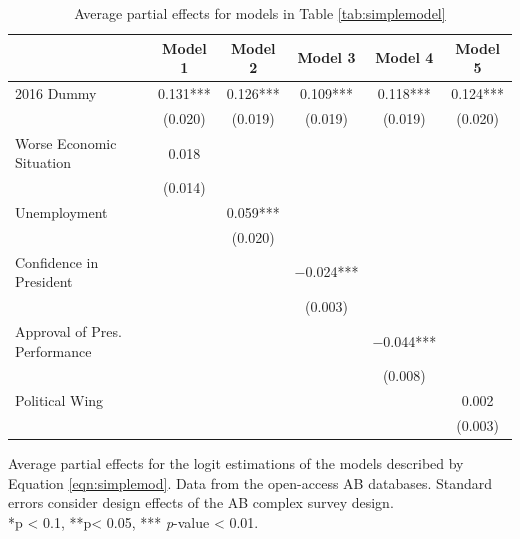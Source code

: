 \documentclass[floatsintext,man]{apa7}\usepackage[]{graphicx}\usepackage[]{color}
\begin{document}
\linespread{1.2}
\begin{table}[htbp]
\begin{center}
\caption{Average partial effects for models in Table \ref{tab:simplemodel}}
\label{tab:apesimp}

\begin{tabular}[t]{lccccc}
\toprule
  & Model 1 & Model 2 & Model 3 & Model 4 & Model 5\\
\midrule
2016 Dummy & \num{0.131}*** & \num{0.126}*** & \num{0.109}*** & \num{0.118}*** & \num{0.124}***\\
 & (\num{0.020}) & (\num{0.019}) & (\num{0.019}) & (\num{0.019}) & (\num{0.020})\\
Worse Economic Situation & \num{0.018} &  &  &  & \\
 & (\num{0.014}) &  &  &  & \\
Unemployment &  & \num{0.059}*** &  &  & \\
 &  & (\num{0.020}) &  &  & \\
Confidence in President &  &  & \num{-0.024}*** &  & \\
 &  &  & (\num{0.003}) &  & \\
Approval of Pres. Performance &  &  &  & \num{-0.044}*** & \\
 &  &  &  & (\num{0.008}) & \\
Political Wing &  &  &  &  & \num{0.002}\\
 &  &  &  &  & (\num{0.003})\\
\bottomrule
\end{tabular}


\end{center}
Average partial effects for the logit estimations of the models described by Equation \ref{eqn:simplemod}. Data from the open-access AB databases. Standard errors consider design effects of the AB complex survey design.\\
*p < 0.1, **p< 0.05, *** \textit{p}-value < 0.01.
\end{table}

\end{document}
